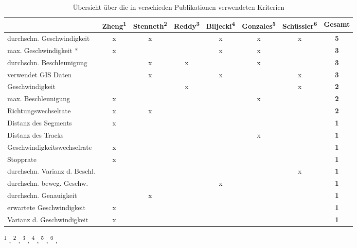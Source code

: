 \begin{landscape}
\begin{table}[h]
\centering
\begin{tabular}{|l|c|c|c|c|c|c|c|}
\hline
 & \multicolumn{1}{l|}{Zheng\textsuperscript{1}} & \multicolumn{1}{l|}{Stenneth\textsuperscript{2}} & \multicolumn{1}{l|}{Reddy\textsuperscript{3}} & \multicolumn{1}{l|}{Biljecki\textsuperscript{4}} & \multicolumn{1}{l|}{Gonzales\textsuperscript{5}} & \multicolumn{1}{l|}{Schüssler\textsuperscript{6}} & \multicolumn{1}{l|}{\textbf{Gesamt}} \\ \hline
durchschn. Geschwindigkeit & x & x &  & x & x & x & \textbf{5} \\ \hline
max. Geschwindigkeit * & x &  &  & x & x &  & \textbf{3} \\ \hline
durchschn. Beschleunigung &  & x & x &  & x &  & \textbf{3} \\ \hline
verwendet GIS Daten &  & x &  & x &  & x & \textbf{3} \\ \hline
Geschwindigkeit &  &  & x &  &  & x & \textbf{2} \\ \hline
max. Beschleunigung & x &  &  &  & x &  & \textbf{2} \\ \hline
Richtungswechselrate & x & x &  &  &  &  & \textbf{2} \\ \hline
Distanz des Segments & x &  &  &  &  &  & \textbf{1} \\ \hline
Distanz des Tracks &  &  &  &  & x &  & \textbf{1} \\ \hline
Geschwindigkeitswechselrate & x &  &  &  &  &  & \textbf{1} \\ \hline
Stopprate & x &  &  &  &  &  & \textbf{1} \\ \hline
durchschn. Varianz d. Beschl. &  &  &  &  &  & x & \textbf{1} \\ \hline
durchschn. beweg. Geschw. &  &  &  & x &  &  & \textbf{1} \\ \hline
durchschn. Genauigkeit &  & x &  &  &  &  & \textbf{1} \\ \hline
erwartete Geschwindigkeit & x &  &  &  &  &  & \textbf{1} \\ \hline
Varianz d. Geschwindigkeit & x &  &  &  &  &  & \textbf{1} \\ \hline
\end{tabular}
\caption{Übersicht über die in verschieden Publikationen verwendeten Kriterien}
\textsuperscript{1} \cite{zheng_understanding_2010}, \textsuperscript{2} \cite{stenneth_transportation_2011}, \textsuperscript{3} \cite{reddy_using_2010}, \textsuperscript{4} \cite{biljecki_transportation_2013}, \textsuperscript{5} \cite{gonzalez_automating_2010}, \textsuperscript{6} \cite{nadine_schussler_improving_2011}, 
\label{variablenuebersicht}
\end{table}
\end{landscape}

